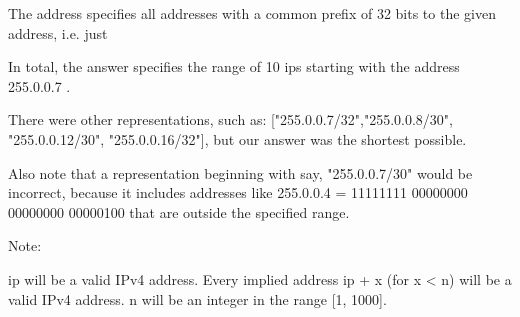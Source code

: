 \begin{flushleft}
The address  specifies all addresses with a common prefix of 32 bits to the given address, i.e. just 


In total, the answer specifies the range of 10 ips starting with the address 255.0.0.7 .

There were other representations, such as:
["255.0.0.7/32","255.0.0.8/30", "255.0.0.12/30", "255.0.0.16/32"],
but our answer was the shortest possible.

Also note that a representation beginning with say, "255.0.0.7/30" would be incorrect,
because it includes addresses like 255.0.0.4 = 11111111 00000000 00000000 00000100 
that are outside the specified range.

\end{flushleft}
Note:

    ip will be a valid IPv4 address.
    Every implied address ip + x (for x < n) will be a valid IPv4 address.
    n will be an integer in the range [1, 1000].
